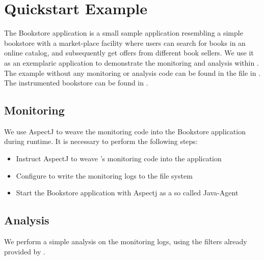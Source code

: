 \chapter{Quickstart Example}\label{chp:Quickstart-Example}

	The Bookstore application is a small sample application resembling a simple bookstore with a market-place facility where users can search for books in an online catalog, and subsequently get offers from different book sellers. We use it as an exemplaric application to demonstrate the monitoring and analysis within \Kieker{}. The example without any monitoring or analysis code can be found in the \file{\binaryFileForDownload} file in \dir{\plainBookstoreApplicationDirDistro}. The instrumented bookstore can be found in \dir{\quickstartBookstoreApplicationDirDistro}.

	\section{Monitoring}
	
		We use AspectJ \cite{AspectJ-WebSite} to weave the \Kieker{} monitoring code into the Bookstore application during runtime. It is necessary to perform the following steps:
		\begin{itemize}
			\setlength{\itemsep}{-2pt}
			\item Instruct AspectJ to weave \Kieker{}'s monitoring code into the application
			\item Configure \Kieker{} to write the monitoring logs to the file system
			\item Start the Bookstore application with Aspectj as a so called Java-Agent 
		\end{itemize}
	
	\section{Analysis}
	
		We perform a simple analysis on the monitoring logs, using the filters already provided by \Kieker{}.